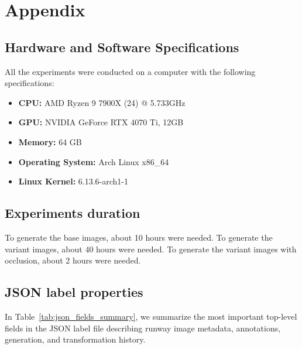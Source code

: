 \chapter{Appendix}


\section{Hardware and Software Specifications}

All the experiments were conducted on a computer with the following
specifications:
\begin{itemize}
    \item \textbf{CPU:} AMD Ryzen 9 7900X (24) @ 5.733GHz
    \item \textbf{GPU:} NVIDIA GeForce RTX 4070 Ti, 12GB
    \item \textbf{Memory:} 64 GB
    \item \textbf{Operating System:} Arch Linux x86\_64
    \item \textbf{Linux Kernel:} 6.13.6-arch1-1
\end{itemize}

\section{Experiments duration}

To generate the base images, about 10 hours were needed. To generate
the variant images, about 40 hours were needed. To generate the variant images
with occlusion, about 2 hours were needed.

\section{JSON label properties}

In Table~\ref{tab:json_fields_summary}, we summarize the most important top-level fields in the JSON label file describing runway image metadata, annotations, generation, and transformation history.

